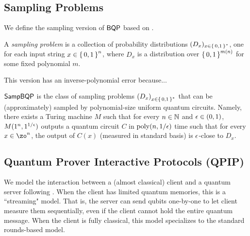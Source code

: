 \subsection{Sampling Problems}

We define the sampling version of $\operatorname{\mathsf{BQP}}$ based on \cite{aaronson_2013}.

\begin{definition} 
    \label{dfn:sampling-problem}
    A \emph{sampling problem} is a collection of probability distributions $(D_x)_{x\in\set{0, 1}^*}$, one for each input string $x\in\set{0,1}^n$, where $D_x$ is a distribution over $\set{0,1}^{m(n)}$ for some fixed polynomial $m$.
\end{definition}

This version has an inverse-polynomial error because...

\begin{definition} [$\SampBQP$]
    $\SampBQP$ is the class of sampling problems $\left(D_x\right)_{x\in\set{0, 1}^*}$ that can be (approximately) sampled by polynomial-size uniform quantum circuits. Namely, there exists a Turing machine $M$ such that for every $n \in \mathbb{N}$ and $\epsilon \in (0,1)$, $M(1^n, 1^{1/\epsilon})$ outputs a quantum circuit $C$ in $\operatorname*{\operatorname{poly}}(n, 1/\epsilon)$ time such that for every $x \in \zo^n$, the output of $C(x)$ (measured in standard basis) is $\epsilon$-close to $D_x$.
\end{definition}

\subsection{Quantum Prover Interactive Protocols (QPIP)}

We model the interaction between a (almost classical) client and a quantum server following \cite{FOCS:Mahadev18a}.
When the client has limited quantum memories, this is a ``streaming" model.
That is, the server can send qubits one-by-one to let client measure them sequentially,
even if the client cannot hold the entire quantum message.
When the client is fully classical,
this model specializes to the standard rounds-based model.

